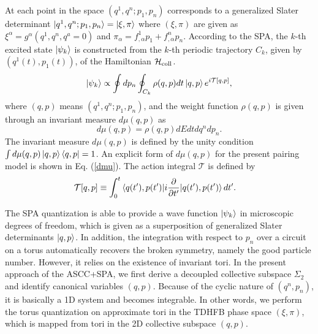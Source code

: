 \documentclass[%
superscriptaddress,
showpacs,
nofootinbib,
amsmath,amssymb,
aps,
prc,
twocolumn,
floatfix ]%
{revtex4-1}
\begin{document}
At each point in the space $(q^1,q^n; p_1,p_n)$ corresponds to
a generalized Slater determinant
$\ket{q^1,q^n;p_1,p_n}=\ket{\xi,\pi}$
where $(\xi,\pi)$ are given as
$\xi^\alpha=g^\alpha(q^1,q^n,q^a=0)$ and
$\pi_\alpha=f^1_{,\alpha}p_1+f^n_{,\alpha}p_n$.
According to the SPA, the $k$-th excited state $\ket{\psi_k}$
is constructed from the $k$-th periodic trajectory $C_k$,
given by $(q^1(t),p_1(t))$,
of the Hamiltonian $\mathcal{H}_{\rm coll}$.
\begin{equation}
\ket{\psi_k} \propto \oint dp_n \oint_{C_k} \rho(q,p) dt \ket{q,p}
	e^{i\mathcal{T}[q,p]} ,
	\label{SPA}
\end{equation}
where $(q,p)$ means $(q^1,q^n;p_1, p_n)$, and the weight function
$\rho(q,p)$ is given through an invariant measure $d\mu(q,p)$ as
\begin{equation}
d\mu(q,p)=\rho(q,p) dE dt dq^n dp_n .
\end{equation}
The invariant measure $d\mu(q,p)$ is defined by the unity condition
$\int d\mu(q,p) \ket{q,p}\bra{q,p} = 1$.
An explicit form of $d\mu(q,p)$ for the present pairing model is shown
in Eq. (\ref{dmu}).
The action integral $\mathcal{T}$ is defined by
\begin{align}
\mathcal{T}[q,p] &\equiv
\int_{0}^{t} \braket{q(t'),p(t')| i\frac{\partial}{\partial t'}
	|q(t'),p(t')} dt' .
\label{tau}
\end{align}

The SPA quantization is able to provide a wave function $\ket{\psi_k}$
in microscopic degrees of freedom, which is given as a superposition
of generalized Slater determinants $\ket{q,p}$.
In addition, the integration with respect to $p_n$ over a circuit on a torus
automatically recovers the broken symmetry, namely the good particle number.
However, it relies on the existence of invariant tori.
In the present approach of the ASCC+SPA,
we first derive a decoupled collective subspace $\Sigma_2$ and identify
canonical variables $(q,p)$.
Because of the cyclic nature of $(q^n,p_n)$, it is basically a 1D system
and becomes integrable.
In other words, we perform the torus quantization on
approximate tori in the TDHFB phase space $(\xi,\pi)$,
which is mapped from tori in the 2D collective subspace $(q,p)$.



\end{document}
